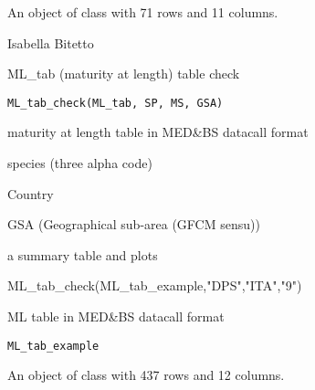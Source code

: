 \documentclass[a4paper]{book}
\begin{document}
%
\begin{Format}
An object of class  with 71 rows and 11 columns.
\end{Format}
%
\begin{Author}\relax
Isabella Bitetto 
\end{Author}
%
\begin{Description}\relax
ML\_tab (maturity at length) table check
\end{Description}
%
\begin{Usage}
\begin{verbatim}
ML_tab_check(ML_tab, SP, MS, GSA)
\end{verbatim}
\end{Usage}
%
\begin{Arguments}
\begin{ldescription}
\item[\code{ML\_tab}] maturity at length table in MED\&BS datacall format

\item[\code{SP}] species (three alpha code)

\item[\code{MS}] Country

\item[\code{GSA}] GSA (Geographical sub-area (GFCM sensu))
\end{ldescription}
\end{Arguments}
%
\begin{Value}
a summary table and plots
\end{Value}
%
\begin{Examples}
\begin{ExampleCode}
ML_tab_check(ML_tab_example,"DPS","ITA","9")
\end{ExampleCode}
\end{Examples}
%
\begin{Description}\relax
ML table in MED\&BS datacall format
\end{Description}
%
\begin{Usage}
\begin{verbatim}
ML_tab_example
\end{verbatim}
\end{Usage}
%
\begin{Format}
An object of class  with 437 rows and 12 columns.
\end{Format}
\end{document}
